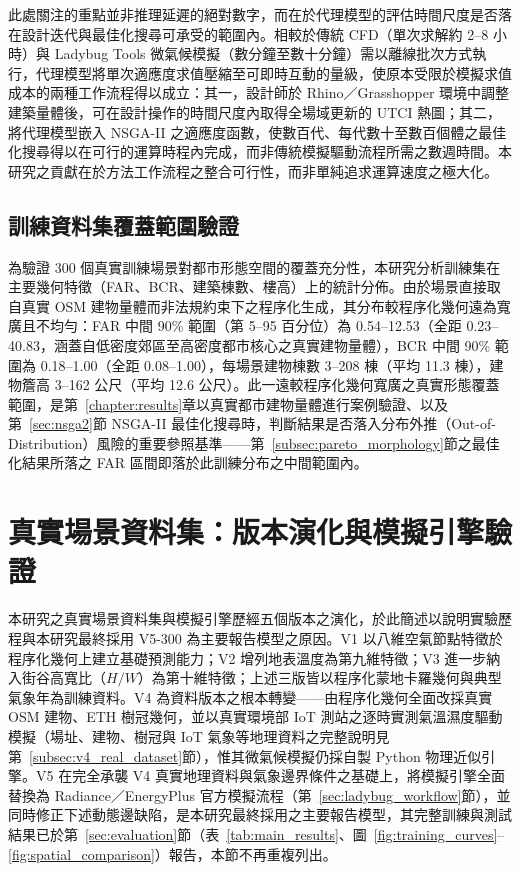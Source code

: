 此處關注的重點並非推理延遲的絕對數字，而在於代理模型的評估時間尺度是否落在設計迭代與最佳化搜尋可承受的範圍內。相較於傳統 CFD（單次求解約 2--8 小時）與 Ladybug Tools 微氣候模擬（數分鐘至數十分鐘）需以離線批次方式執行，代理模型將單次適應度求值壓縮至可即時互動的量級，使原本受限於模擬求值成本的兩種工作流程得以成立：其一，設計師於 Rhino／Grasshopper 環境中調整建築量體後，可在設計操作的時間尺度內取得全場域更新的 UTCI 熱圖；其二，將代理模型嵌入 NSGA-II 之適應度函數，使數百代、每代數十至數百個體之最佳化搜尋得以在可行的運算時程內完成，而非傳統模擬驅動流程所需之數週時間。本研究之貢獻在於方法工作流程之整合可行性，而非單純追求運算速度之極大化。


\subsection{訓練資料集覆蓋範圍驗證}
\label{subsec:coverage}

為驗證 300 個真實訓練場景對都市形態空間的覆蓋充分性，本研究分析訓練集在主要幾何特徵（FAR、BCR、建築棟數、樓高）上的統計分佈。由於場景直接取自真實 OSM 建物量體而非法規約束下之程序化生成，其分布較程序化幾何遠為寬廣且不均勻：FAR 中間 90\% 範圍（第 5--95 百分位）為 0.54--12.53（全距 0.23--40.83，涵蓋自低密度郊區至高密度都市核心之真實建物量體），BCR 中間 90\% 範圍為 0.18--1.00（全距 0.08--1.00），每場景建物棟數 3--208 棟（平均 11.3 棟），建物簷高 3--162 公尺（平均 12.6 公尺）。此一遠較程序化幾何寬廣之真實形態覆蓋範圍，是第~\ref{chapter:results}章以真實都市建物量體進行案例驗證、以及第~\ref{sec:nsga2}節 NSGA-II 最佳化搜尋時，判斷結果是否落入分布外推（Out-of-Distribution）風險的重要參照基準——第~\ref{subsec:pareto_morphology}節之最佳化結果所落之 FAR 區間即落於此訓練分布之中間範圍內。


\section{真實場景資料集：版本演化與模擬引擎驗證}
\label{sec:v4_validation}

本研究之真實場景資料集與模擬引擎歷經五個版本之演化，於此簡述以說明實驗歷程與本研究最終採用 V5-300 為主要報告模型之原因。V1 以八維空氣節點特徵於程序化幾何上建立基礎預測能力；V2 增列地表溫度為第九維特徵；V3 進一步納入街谷高寬比（$H/W$）為第十維特徵；上述三版皆以程序化蒙地卡羅幾何與典型氣象年為訓練資料。V4 為資料版本之根本轉變——由程序化幾何全面改採真實 OSM 建物、ETH 樹冠幾何，並以真實環境部 IoT 測站之逐時實測氣溫濕度驅動模擬（場址、建物、樹冠與 IoT 氣象等地理資料之完整說明見第~\ref{subsec:v4_real_dataset}節），惟其微氣候模擬仍採自製 Python 物理近似引擎。V5 在完全承襲 V4 真實地理資料與氣象邊界條件之基礎上，將模擬引擎全面替換為 Radiance／EnergyPlus 官方模擬流程（第~\ref{sec:ladybug_workflow}節），並同時修正下述動態邊缺陷，是本研究最終採用之主要報告模型，其完整訓練與測試結果已於第~\ref{sec:evaluation}節（表~\ref{tab:main_results}、圖~\ref{fig:training_curves}--\ref{fig:spatial_comparison}）報告，本節不再重複列出。


